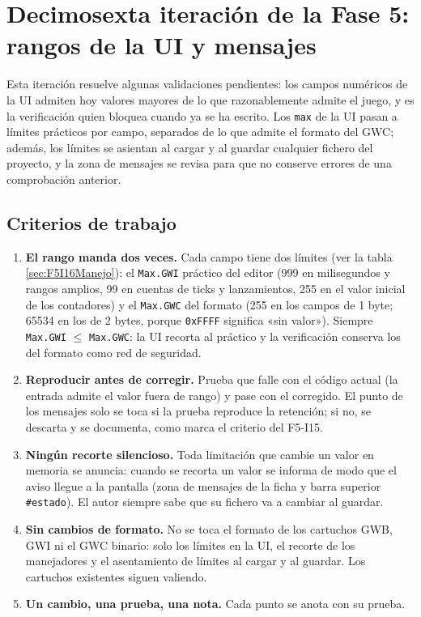 \section{Decimosexta iteración de la Fase 5: rangos de la UI y mensajes}
\label{sec:F5I16}

Esta iteración resuelve algunas validaciones pendientes: los campos numéricos de la UI admiten hoy valores mayores de lo que razonablemente admite el juego, y es la verificación quien bloquea cuando ya se ha escrito. Los \texttt{max} de la UI pasan a límites prácticos por campo, separados de lo que admite el formato del GWC; además, los límites se asientan al cargar y al guardar cualquier fichero del proyecto, y la zona de mensajes se revisa para que no conserve errores de una comprobación anterior.

\subsection{Criterios de trabajo}
\label{sec:F5I16Criterios}

\begin{enumerate}
	\item \textbf{El rango manda dos veces.} Cada campo tiene dos límites (ver la tabla   \ref{sec:F5I16Manejo}): el \texttt{Max.GWI} práctico del editor (999 en milisegundos y rangos amplios, 99 en cuentas de ticks y lanzamientos, 255 en el valor inicial de los contadores) y el \texttt{Max.GWC} del formato (255 en los campos de 1 byte; 65534 en los de 2 bytes, porque \texttt{0xFFFF} significa «sin valor»). Siempre \texttt{Max.GWI} $\leq$ \texttt{Max.GWC}: la UI recorta al práctico y la verificación conserva los del formato como red de seguridad.
	
	\item \textbf{Reproducir antes de corregir.} Prueba que falle con el código actual (la entrada admite el valor fuera de rango) y pase con el corregido. El punto de los mensajes solo se toca si la prueba reproduce la retención; si no, se descarta y se documenta, como marca el criterio del F5-I15.
	
	\item \textbf{Ningún recorte silencioso.} Toda limitación que cambie un valor en memoria se anuncia: cuando se recorta un valor se informa de modo que el aviso llegue a la pantalla (zona de mensajes de la ficha y barra superior \texttt{\#estado}). El autor siempre sabe que su fichero va a cambiar al guardar.
	
	\item \textbf{Sin cambios de formato.} No se toca el formato de los cartuchos GWB, GWI ni el GWC binario: solo los límites en la UI, el recorte de los manejadores y el asentamiento de límites al cargar y al guardar. Los cartuchos existentes siguen valiendo.
	
	\item \textbf{Un cambio, una prueba, una nota.} Cada punto se anota con su prueba.
\end{enumerate}

